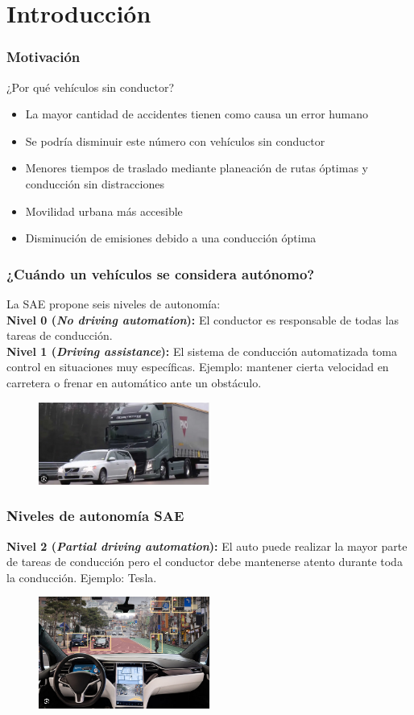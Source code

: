 \section{Introducción}

\begin{frame}\frametitle{Motivación}
  ¿Por qué vehículos sin conductor?
  \begin{itemize}
  \item La mayor cantidad de accidentes tienen como causa un error humano
  \item Se podría disminuir este número con vehículos sin conductor
  \item Menores tiempos de traslado mediante planeación de rutas óptimas y conducción sin distracciones
  \item Movilidad urbana más accesible
  \item Disminución de emisiones debido a una conducción óptima
  \end{itemize}
\end{frame}

\begin{frame}\frametitle{¿Cuándo un vehículos se considera autónomo?}
  La SAE propone seis niveles de autonomía:
  \[\]
  \textbf{Nivel 0 (\textit{No driving automation}):} El conductor es responsable de todas las tareas de conducción.
  \[\]
  \textbf{Nivel 1 (\textit{Driving assistance}):} El sistema de conducción automatizada toma control en situaciones muy específicas. Ejemplo: mantener cierta velocidad en carretera o frenar en automático ante un obstáculo.
  \begin{figure}
    \centering
    \includegraphics[width=0.5\textwidth]{Figuras/EjemploSAE1.png}
  \end{figure}
\end{frame}

\begin{frame}\frametitle{Niveles de autonomía SAE}
  \textbf{Nivel 2 (\textit{Partial driving automation}):} El auto puede realizar la mayor parte de tareas de conducción pero el conductor debe mantenerse atento durante toda la conducción. Ejemplo: Tesla.
  \begin{figure}
    \centering
    \includegraphics[width=0.5\textwidth]{Figuras/EjemploSAE2.png}
  \end{figure}
\end{frame}

